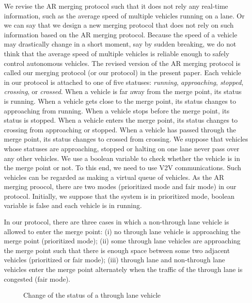 \documentclass[10pt, conference, compsocconf]{IEEEtran}
\begin{document}
We revise the AR merging protocol such that it does not rely any
real-time information, such as the average speed of multiple vehicles
running on a lane. Or we can say that we design a new merging protocol
that does not rely on such information based on the AR merging
protocol. Because the speed of a vehicle may drastically change in a
short moment, say by sudden breaking, we do not think that the average
speed of multiple vehicles is reliable enough to safely control
autonomous vehicles. The revised version of the AR merging protocol is
called our merging protocol (or our protocol) in the present paper.
Each vehicle in our protocol is attached to one of five statuses:
\textit{running}, \textit{approaching}, \textit{stopped},
\textit{crossing}, or \textit{crossed}.  When a vehicle
is far away from the merge point, its status is running. When a
vehicle gets close to the merge point, its status changes to
approaching from running. When a vehicle stops before the merge point,
its status is stopped. When a vehicle enters the
merge point, its status changes to crossing from approaching or stopped. 
When a vehicle has passed through the merge point, its
status changes to crossed from crossing. We suppose that vehicles
whose statuses are approaching, stopped or halting on one lane never
pass over any other vehicles. We use a boolean variable to check whether
the vehicle is in the merge point or not. To this end, we need to use V2V
communications. Such vehicles can be regarded as making a virtual
queue of vehicles. As the AR merging proocol, there are two modes
(prioritized mode and fair mode) in our protocol. Initially,
we suppose that the system is in prioritized mode, boolean variable is false
and each vehicle is in running.

In our protocol, there are three cases in which a non-through lane
vehicle is allowed to enter the merge point: (i) no through lane
vehicle is approaching the merge point (prioritized mode); (ii) some through lane
vehicles are approaching the merge point such that there is enough
space between some two adjacent vehicles (prioritized or fair mode); (iii) through lane and
non-through lane vehicles enter the merge point alternately when the
traffic of the through lane is congested (fair mode).

\begin{figure}[h]
\begin{center}
\end{center}
\caption{Change of the status of a through lane vehicle}
\label{throughLaneStatus}
\end{figure}
\end{document}
